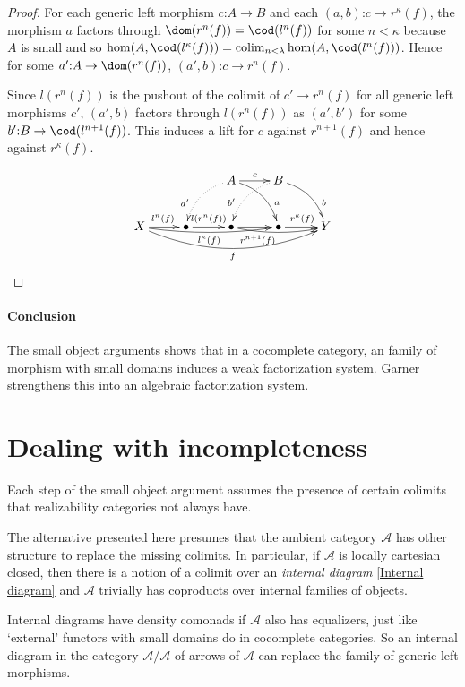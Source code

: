\documentclass{tac}
\newcommand\cat\mathcal
\newcommand\of{\mathord:}
\newcommand\colim{\mathop{\mathrm{colim}}}
\begin{document}
\begin{proof}
For each generic left morphism $c\of A \to B$ and each $(a,b)\of c\to r^\kappa(f)$, the morphism $a$ factors through $\dom(r^n(f)) = \cod(l^n(f))$ for some $n<\kappa$ because $A$ is small and so $\hom(A,\cod(l^\kappa(f))) =\colim_{n<\lambda} \hom(A,\cod(l^n(f)))$.
Hence for some $a'\of A\to \dom(r^n(f))$, $(a',b)\of c\to r^n(f)$.

Since $l(r^n(f))$ is the pushout of the colimit of $c'\to r^n(f)$ for all generic left morphisms $c'$, $(a',b)$ factors through $l(r^n(f))$ as $(a',b')$ for some $b'\of B \to \cod(l^{n+1}(f))$. This induces a lift for $c$ against $r^{n+1}(f)$ and hence against $r^\kappa(f)$.

\[\xymatrix{
&& A\ar[r]^{c}\ar@/^2ex/[dr]^(.7)a\ar@{.>}@/_2ex/[dl]_(.7){a'} & B\ar@/^2ex/[dr]^(.7)b\ar@{.>}@/_2ex/[dl]_(.7){b'} \\
X \ar[r]^{l^n(f)} \ar@/_1ex/[rrr]_{l^{\kappa}(f)} \ar@/_4ex/[rrrr]_{f} & \bullet \ar[r]^{l(r^n(f))}  & \bullet \ar[r]\ar@/_1ex/[rr]_(.3){r^{n+1}(f)} & \bullet \ar[r]^{r^\kappa(f)} & Y
}\]
\end{proof}

\paragraph{Conclusion}
The small object arguments shows that in a cocomplete category, an family of morphism with small domains induces a weak factorization system. Garner %
strengthens this into an algebraic factorization system.

\section{Dealing with incompleteness}
Each step of the small object argument assumes the presence of certain colimits that realizability categories not always have.

The alternative presented here presumes that the ambient category $\cat A$ has other structure to replace the missing colimits. In particular, if $\cat A$ is locally cartesian closed, then there is a notion of a colimit over an \emph{internal diagram} \ref{Internal diagram} and $\cat A$ trivially has coproducts over internal families of objects.

Internal diagrams have density comonads if $\cat A$ also has equalizers, just like `external' functors with small domains do in cocomplete categories. So an internal diagram in the category $\cat A/\cat A$ of arrows of $\cat A$ can replace the family of generic left morphisms.
\end{document}
